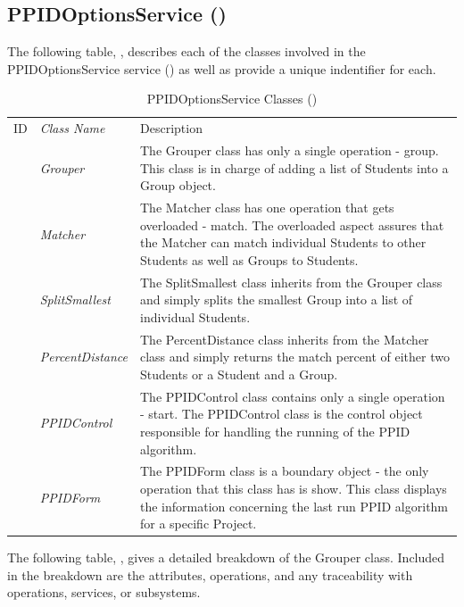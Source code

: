 \documentclass[12pt,letterpaper]{article}
\begin{document}
\subsection{PPIDOptionsService ()}

The following table, , describes each of the classes involved in the PPIDOptionsService service () as well as provide a unique indentifier for each.

\begin{table}[H]
	\caption{PPIDOptionsService Classes ()} 
	\begin{tabu} to 
	    \tableheader{}ID & Class Name & Description \\
		 & Grouper & The Grouper class has only a single operation - group. This class is in charge of adding a list of Students into a Group object.\\
		 & Matcher & The Matcher class has one operation that gets overloaded - match. The overloaded aspect assures that the Matcher can match individual Students to other Students as well as Groups to Students.\\
		 & SplitSmallest & The SplitSmallest class inherits from the Grouper class and simply splits the smallest Group into a list of individual Students.\\
		 & PercentDistance & The PercentDistance class inherits from the Matcher class and simply returns the match percent of either two Students or a Student and a Group.\\
		 & PPIDControl & The PPIDControl class contains only a single operation - start. The PPIDControl class is the control object responsible for handling the running of the PPID algorithm.\\
		 & PPIDForm & The PPIDForm class is a boundary object - the only operation that this class has is show. This class displays the information concerning the last run PPID algorithm for a specific Project.\\
	\end{tabu}
\end{table}

\newpage{}
The following table, , gives a detailed breakdown of the Grouper class. Included in the breakdown are the attributes, operations, and any traceability with operations, services, or subsystems.
\end{document}
